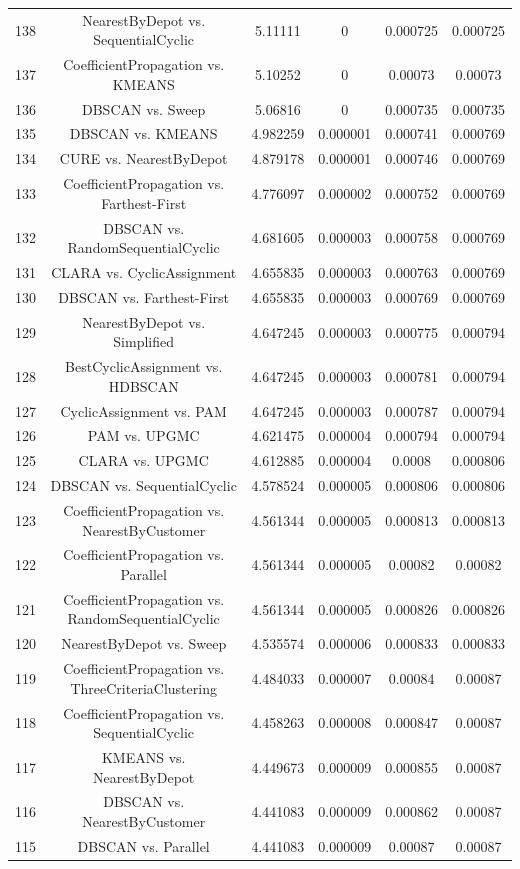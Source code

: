 \documentclass[a4paper,10pt]{article}
\begin{document}
\begin{landscape}
\begin{table}[!htp]
\begin{tabular}{cccccc}
138&NearestByDepot vs. SequentialCyclic&5.11111&0&0.000725&0.000725\\
137&CoefficientPropagation vs. KMEANS&5.10252&0&0.00073&0.00073\\
136&DBSCAN vs. Sweep&5.06816&0&0.000735&0.000735\\
135&DBSCAN vs. KMEANS&4.982259&0.000001&0.000741&0.000769\\
134&CURE vs. NearestByDepot&4.879178&0.000001&0.000746&0.000769\\
133&CoefficientPropagation vs. Farthest-First&4.776097&0.000002&0.000752&0.000769\\
132&DBSCAN vs. RandomSequentialCyclic&4.681605&0.000003&0.000758&0.000769\\
131&CLARA vs. CyclicAssignment&4.655835&0.000003&0.000763&0.000769\\
130&DBSCAN vs. Farthest-First&4.655835&0.000003&0.000769&0.000769\\
129&NearestByDepot vs. Simplified&4.647245&0.000003&0.000775&0.000794\\
128&BestCyclicAssignment vs. HDBSCAN&4.647245&0.000003&0.000781&0.000794\\
127&CyclicAssignment vs. PAM&4.647245&0.000003&0.000787&0.000794\\
126&PAM vs. UPGMC&4.621475&0.000004&0.000794&0.000794\\
125&CLARA vs. UPGMC&4.612885&0.000004&0.0008&0.000806\\
124&DBSCAN vs. SequentialCyclic&4.578524&0.000005&0.000806&0.000806\\
123&CoefficientPropagation vs. NearestByCustomer&4.561344&0.000005&0.000813&0.000813\\
122&CoefficientPropagation vs. Parallel&4.561344&0.000005&0.00082&0.00082\\
121&CoefficientPropagation vs. RandomSequentialCyclic&4.561344&0.000005&0.000826&0.000826\\
120&NearestByDepot vs. Sweep&4.535574&0.000006&0.000833&0.000833\\
119&CoefficientPropagation vs. ThreeCriteriaClustering&4.484033&0.000007&0.00084&0.00087\\
118&CoefficientPropagation vs. SequentialCyclic&4.458263&0.000008&0.000847&0.00087\\
117&KMEANS vs. NearestByDepot&4.449673&0.000009&0.000855&0.00087\\
116&DBSCAN vs. NearestByCustomer&4.441083&0.000009&0.000862&0.00087\\
115&DBSCAN vs. Parallel&4.441083&0.000009&0.00087&0.00087\\

\end{tabular}
\end{table}
\end{landscape}
\end{document}
